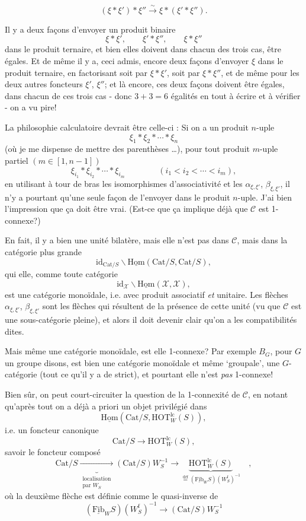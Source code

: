 \documentclass[11pt]{article}
\newcommand{\printedpage}[1]{\marginpar{\footnotesize p.~#1}}
\newcommand{\msp}[1]{\marginpar{\footnotesize [#1]}}
\newcommand{\Hom}{\underline{\mathrm{Hom}}}
\newcommand{\Fib}{\underline{\mathrm{Fib}}}
\newcommand{\Cat}{\mathrm{Cat}}
\newcommand{\HOT}{\mathrm{HOT}}
\newcommand{\id}{\mathrm{id}}
\begin{document}
\msp{page 202}
\[
(\xi * \xi') * \xi'' \xrightarrow{\sim} \xi * (\xi' * \xi'').
\]

Il y a deux façons d'envoyer un produit binaire
\[
\xi * \xi', \qquad \xi' * \xi'', \qquad \xi * \xi''
\]
dans le produit ternaire, et bien elles doivent dans chacun des trois cas, être égales. Et de même il y a, ceci admis, encore deux façons d'envoyer $\xi$ dans le produit ternaire, en factorisant soit par $\xi * \xi'$, soit par $\xi * \xi''$, et de même pour les deux autres foncteurs $\xi'$, $\xi''$; et là encore, ces deux façons doivent être égales, dans chacun de ces trois cas - donc $3 + 3 = 6$ égalités en tout à écrire et à vérifier - on a vu pire!

La philosophie calculatoire devrait être celle-ci : Si on a un produit $n$-uple
\[
\xi_1 * \xi_2 * \cdots * \xi_n
\]
(où je me dispense de mettre des parenthèses \dots), pour tout produit $m$-uple partiel $(m \in [1, n-1])$\msp{page 203}
\[
\xi_{i_1} * \xi_{i_2} * \cdots * \xi_{i_m} \qquad\qquad (i_1 < i_2 < \cdots < i_m),
\]
en utilisant à tour de bras les isomorphismes d'associativité et les $\alpha_{\xi,\xi'}$, $\beta_{\xi,\xi'}$, il n'y a pourtant qu'une seule façon de l'envoyer dans le produit $n$-uple. J'ai bien l'impression que ça doit être vrai. (Est-ce que ça implique déjà que $\mathcal{C}$ est 1-connexe?)

En fait, il y a bien une unité bilatère, mais elle n'est pas dans $\mathcal{C}$, mais dans la catégorie plus grande
\[
\id_{\Cat/S}\backslash\Hom(\Cat/S, \Cat/S),
\]
qui elle, comme toute catégorie
\[
\id_{\mathcal{X}}\backslash\Hom(\mathcal{X}, \mathcal{X}),
\]
\printedpage{133}
est une catégorie monoïdale, i.e. avec produit associatif \textit{et} unitaire. Les flèches $\alpha_{\xi,\xi'}$, $\beta_{\xi,\xi'}$ sont les flèches qui résultent de la présence de cette unité (vu que $\mathcal{C}$ est une sous-catégorie pleine), et alors il doit devenir clair qu'on a les compatibilités dites.

\msp{page 204}Mais même une catégorie monoïdale, est elle 1-connexe? Par exemple $B_G$, pour $G$ un groupe disons, est bien une catégorie monoïdale et même ‘groupale’, une $G$-catégorie (tout ce qu'il y a de strict), et pourtant elle n'est \textit{pas} 1-connexe!

Bien sûr, on peut court-circuiter la question de la 1-connexité de $\mathcal{C}$, en notant qu'après tout on a déjà a priori un objet privilégié dans
\[
\Hom(\Cat/S, \HOT^{\mathrm{lc}}_W(S)),
\]
i.e. un foncteur canonique
\[
\Cat/S \longrightarrow \HOT^{\mathrm{lc}}_W(S),
\]
savoir le foncteur composé
\[
\Cat/S \underbrace{\longrightarrow}_{\substack{\text{localisation}\\ \text{par } W_S}} (\Cat/S)W_S^{-1} \longrightarrow \underbrace{\HOT^{\mathrm{lc}}_W(S)}_{\overset{\text{déf}}{=} (\Fib_W S)(W^{\mathrm{f}}_S)^{-1}} \quad ,
\tag*{$(*)$}
\]
où la deuxième flèche est définie comme le quasi-inverse de
\[
(\Fib_W S)(W^{\mathrm{f}}_S)^{-1} \longrightarrow (\Cat/S)W_S^{-1}
\tag*{$(**)$}
\]
\end{document}
